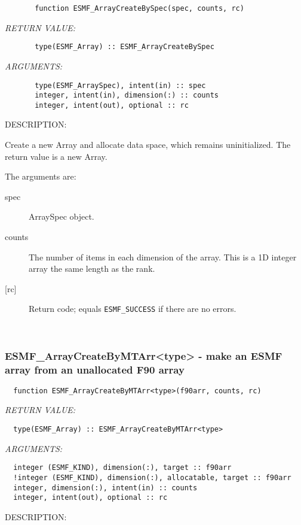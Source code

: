 \begin{verbatim}       function ESMF_ArrayCreateBySpec(spec, counts, rc)\end{verbatim}{\em RETURN VALUE:}
\begin{verbatim}       type(ESMF_Array) :: ESMF_ArrayCreateBySpec\end{verbatim}{\em ARGUMENTS:}
\begin{verbatim}       type(ESMF_ArraySpec), intent(in) :: spec
       integer, intent(in), dimension(:) :: counts
       integer, intent(out), optional :: rc\end{verbatim}
{\sf DESCRIPTION:\\ }


   Create a new Array and allocate data space, which remains uninitialized.
   The return value is a new Array.
  
   The arguments are:
   \begin{description}
  
   \item[spec]
   ArraySpec object.
  
   \item[counts]
   The number of items in each dimension of the array. This is a 1D
   integer array the same length as the rank.
  
   \item[{[rc]}]
   Return code; equals {\tt ESMF\_SUCCESS} if there are no errors.
  
   \end{description}
   
 
\mbox{}\hrulefill\ 
 
\subsubsection [ESMF\_ArrayCreateByMTArr<type>] {ESMF\_ArrayCreateByMTArr<type> - make an ESMF array from an unallocated F90 array }


  
\begin{verbatim}  function ESMF_ArrayCreateByMTArr<type>(f90arr, counts, rc) 
   \end{verbatim}{\em RETURN VALUE:}
\begin{verbatim}  type(ESMF_Array) :: ESMF_ArrayCreateByMTArr<type> 
   \end{verbatim}{\em ARGUMENTS:}
\begin{verbatim}  integer (ESMF_KIND), dimension(:), target :: f90arr 
  !integer (ESMF_KIND), dimension(:), allocatable, target :: f90arr 
  integer, dimension(:), intent(in) :: counts 
  integer, intent(out), optional :: rc 
   \end{verbatim}
{\sf DESCRIPTION:\\ }

